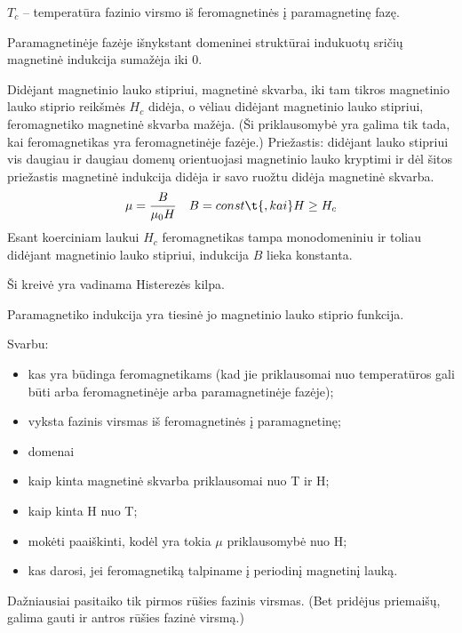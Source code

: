 $T_{c}$ – temperatūra fazinio virsmo iš feromagnetinės į paramagnetinę
fazę.

Paramagnetinėje fazėje išnykstant domeninei struktūrai indukuotų
sričių magnetinė indukcija sumažėja iki 0.

Didėjant magnetinio lauko stipriui, magnetinė skvarba, iki tam tikros
magnetinio lauko stiprio reikšmės $H_{c}$ didėja, o vėliau didėjant
magnetinio lauko stipriui, feromagnetiko magnetinė skvarba mažėja.
(Ši priklausomybė yra galima tik tada, kai feromagnetikas yra 
feromagnetinėje fazėje.)
Priežastis: didėjant lauko stipriui vis daugiau ir daugiau domenų
orientuojasi magnetinio lauko kryptimi ir dėl šitos priežastis
magnetinė indukcija didėja ir savo ruožtu didėja magnetinė
skvarba.
\begin{align*}
  \mu &= \frac{B}{\mu_{0}H} & B = const\t{, kai} H \geq H_{c} \\
\end{align*}
Esant koerciniam laukui $H_{c}$ feromagnetikas tampa monodomeniniu ir
toliau didėjant magnetinio lauko stipriui, indukcija $B$ lieka konstanta.


Ši kreivė yra vadinama Histerezės kilpa.

Paramagnetiko indukcija yra tiesinė jo magnetinio lauko stiprio
funkcija.

Svarbu:
\begin{itemize}
  \item kas yra būdinga feromagnetikams (kad jie priklausomai nuo
    temperatūros gali būti arba feromagnetinėje arba paramagnetinėje
    fazėje);
  \item vyksta fazinis virsmas iš feromagnetinės į paramagnetinę;
  \item domenai
  \item kaip kinta magnetinė skvarba priklausomai nuo T ir H;
  \item kaip kinta H nuo T;
  \item mokėti paaiškinti, kodėl yra tokia $\mu$ priklausomybė nuo H;
  \item kas darosi, jei feromagnetiką talpiname į periodinį magnetinį
    lauką.
\end{itemize}
Dažniausiai pasitaiko tik pirmos rūšies fazinis virsmas. (Bet pridėjus
priemaišų, galima gauti ir antros rūšies fazinė virsmą.)

